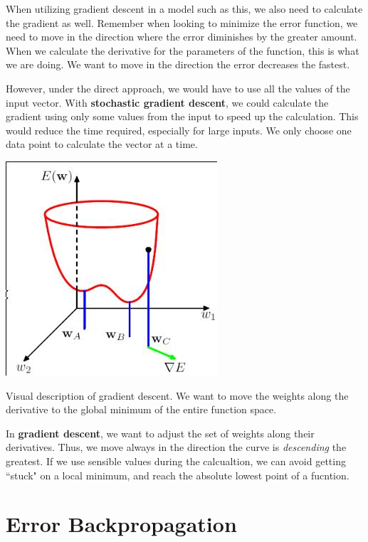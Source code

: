 \documentclass{tufte-handout}
\begin{document}
When utilizing gradient descent in a model such as this, we also need to calculate the gradient 
as well. Remember when looking to minimize the error function, we need to move in the direction 
where the error diminishes by the greater amount. When we calculate the derivative for the
parameters of the function, this is what we are doing. We want to move in the direction the 
error decreases the fastest.

However, under the direct approach, we would have to use all the values of the input vector. 
With \textbf{stochastic gradient descent}, we could calculate the gradient using only some values
from the input to speed up the calculation.  This would reduce the time required, especially for
large inputs. We only choose one data point to calculate the vector at a time.

\begin{marginfigure}
	\includegraphics[scale=0.4]{gradient_descent}
	\caption{Visual description of gradient descent. We want to move 
		the weights along the derivative to the global minimum of the
		entire function space.}
\end{marginfigure}

In \textbf{gradient descent}, we want to adjust the set of weights along their derivatives. Thus,
we move always in the direction the curve is \textit{descending} the greatest. If we use sensible 
values during the calcualtion, we can avoid getting ``stuck" on a local minimum, and reach the 
absolute lowest point of a fucntion.
\section{Error Backpropagation}
\end{document}

